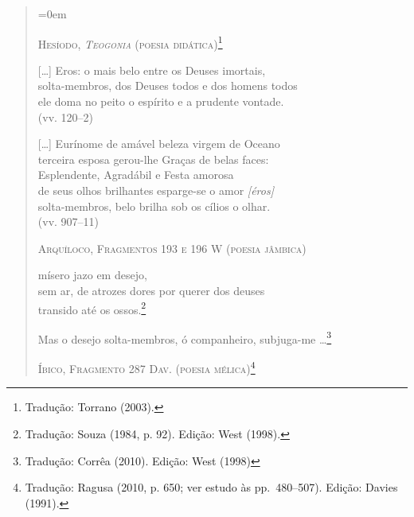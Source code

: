 \begin{quote} \parindent=0em
{\centering
\textsc{Hesíodo, \textit{Teogonia} (poesia didática)\footnote{ Tradução:
Torrano (2003).}}
\par}

\smallskip

	[\ldots{}] Eros: o mais belo entre os Deuses imortais,\\
	solta-membros, dos Deuses todos e dos homens todos\\
	ele doma no peito o espírito e a prudente vontade.\\
	\mbox{}\hfill (vv. 120--2)

\smallskip

	\hspace*{2em}[\ldots{}] Eurínome de amável beleza virgem de Oceano\\
	\hspace*{4.5em}terceira esposa gerou-lhe Graças de belas faces:\\
	\hspace*{4.5em}Esplendente, Agradábil e Festa amorosa\\
	\hspace*{4.5em}de seus olhos brilhantes esparge-se o amor \textit{[éros]}\\
	\hspace*{4.5em}solta-membros, belo brilha sob os cílios o olhar.\\
	\mbox{}\hfill (vv. 907--11)

\bigskip

{\centering
\textsc{Arquíloco, Fragmentos 193 e 196 W (poesia jâmbica)}
\par}

\smallskip

	\hspace*{4.5em}mísero jazo em desejo,\\
	\hspace*{2em}sem ar, de atrozes dores por querer dos deuses\\
	\hspace*{4.5em}transido até os ossos.\footnote{ Tradução: Souza (1984, p. 92). Edição: West (1998).}

\smallskip

	Mas o desejo solta-membros, ó companheiro, subjuga-me
	\ldots{}\footnote{ Tradução: Corrêa (2010). Edição: West (1998)}

\bigskip

{\centering
\textsc{Íbico, Fragmento 287 Dav. (poesia mélica)\footnote{ Tradução: Ragusa (2010, p.
650; ver estudo às pp.~480--507). Edição: Davies (1991).}}
\par}


\end{quote}
